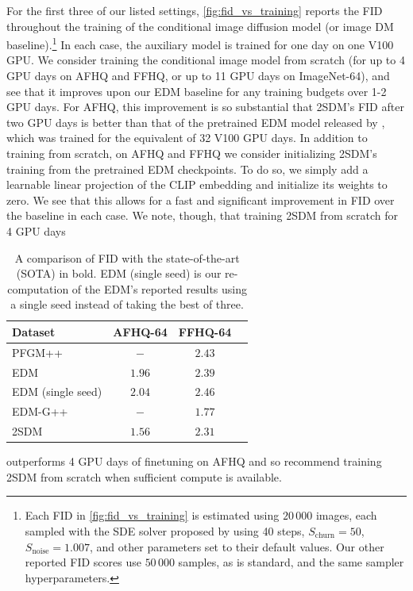 For the first three of our listed settings, \cref{fig:fid_vs_training} reports the FID throughout the training of the conditional image diffusion model (or image DM baseline).\footnote{Each FID in \cref{fig:fid_vs_training} is estimated using $20\,000$ images, each sampled with the SDE solver proposed by \citet{karras2022elucidating} using 40 steps, $S_\text{churn}=50$, $S_\text{noise}=1.007$, and other parameters set to their default values. Our other reported FID scores use $50\,000$ samples, as is standard, and the same sampler hyperparameters.}  In each case, the auxiliary model is trained for one day on one V100 GPU. We consider training the conditional image model from scratch (for up to 4 GPU days on AFHQ and FFHQ, or up to 11 GPU days on ImageNet-64), and see that it improves upon our EDM baseline for any training budgets over 1-2 GPU days. For AFHQ, this improvement is so substantial that 2SDM's FID after two GPU days is better than that of the pretrained EDM model released by \citet{karras2022elucidating}, which was trained for the equivalent of 32 V100 GPU days. In addition to training from scratch, on AFHQ and FFHQ we consider initializing 2SDM's training from the pretrained EDM checkpoints. To do so, we simply add a learnable linear projection of the CLIP embedding and initialize its weights to zero. We see that this allows for a fast and significant improvement in FID over the baseline in each case. We note, though, that training 2SDM from scratch for 4 GPU days 
\begin{table}
\centering
\caption{A comparison of FID with the state-of-the-art (SOTA) in bold. EDM (single seed) is our re-computation of the EDM's reported results using a single seed instead of taking the best of three.}
\label{tab:2sdm-sota}
\begin{tabular}{lccc}
\midrule
Dataset         & AFHQ-64 & FFHQ-64 \\
\midrule
PFGM++~\citep{xu2023pfgm++}          & $-$ & $2.43$ \\
EDM~\citep{karras2022elucidating}
& $1.96$ & $2.39$  \\
EDM (single seed)     & $2.04$ & $2.46$  \\
EDM-G++~\citep{kim2022refining}               & $-$    & $\mathbf{1.77}$  \\
2SDM            & $\mathbf{1.56}$ & $2.31$ \\
\end{tabular}
\end{table}
outperforms 4 GPU days of finetuning on AFHQ and so recommend training 2SDM from scratch when sufficient compute is available.

